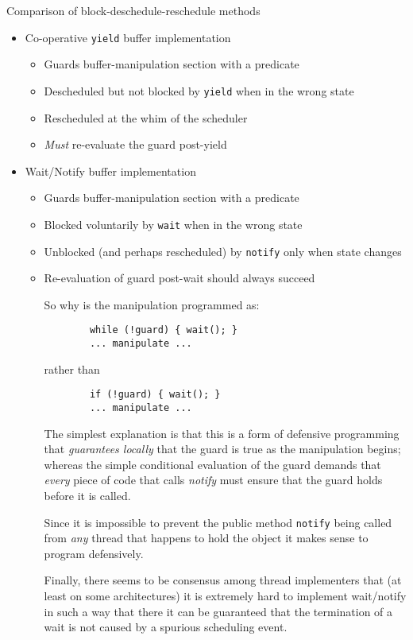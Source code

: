 \documentclass{concdistfoils}
\def\heading#1{\begin{cframed}[8.8in]{#1}\end{cframed}}
\begin{document}
\begin{slide}
\heading{Comparison of block-deschedule-reschedule methods}
\vfill
\begin{itemize}
\item Co-operative \texttt{yield}  buffer implementation
\begin{itemize}
\item Guards buffer-manipulation section with a predicate
\item Descheduled but not blocked by \texttt{yield} when in the wrong state 
\item Rescheduled at the whim of the scheduler
\item \textit{Must} re-evaluate the guard post-yield
\end{itemize}
\vfill
\item Wait/Notify buffer implementation
\begin{itemize}
\item Guards buffer-manipulation section with a predicate
\item Blocked voluntarily by \texttt{wait} when in the wrong state 
\item Unblocked (and perhaps rescheduled) by \texttt{notify} only when state changes
\item Re-evaluation of guard post-wait should always succeed
\begin{note}
So why is the manipulation programmed as: 

\begin{verbatim}
        while (!guard) { wait(); } 
        ... manipulate ...
\end{verbatim}
rather than
\begin{verbatim}
        if (!guard) { wait(); } 
        ... manipulate ...
\end{verbatim}

The simplest explanation is that this is a form of defensive programming
that \textit{guarantees locally} that the guard is true as the manipulation begins; 
whereas the simple conditional evaluation of the guard demands that
\textit{every} piece of code that calls \textit{notify} must ensure that
the guard holds before it is called. 

Since it is impossible to prevent the public method \texttt{notify}
being called from \textit{any} thread that happens to hold the object
it makes sense to program defensively.

Finally, there seems to be consensus among thread implementers that (at least on some
architectures)  it is extremely hard to implement wait/notify in such
a way that there it can be guaranteed that the termination of a wait
is not caused by a spurious scheduling event. 
\end{note}
\end{itemize}
\end{itemize}
\end{slide}
\end{document}
